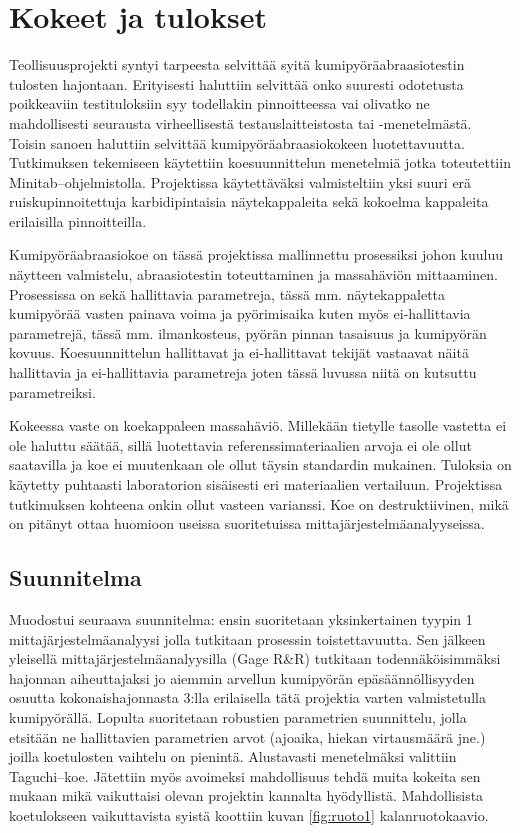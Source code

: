 \documentclass[12pt,a4paper,finnish]{tutthesis}
\begin{document}
\chapter{Kokeet ja tulokset}
\label{ch:kokeet}


Teollisuusprojekti syntyi tarpeesta selvittää syitä
kumipyöräabraasiotestin tulosten hajontaan. Erityisesti
haluttiin selvittää onko suuresti odotetusta poikkeaviin
testituloksiin syy todellakin pinnoitteessa vai olivatko
ne mahdollisesti seurausta virheellisestä testauslaitteistosta
tai -menetelmästä. Toisin sanoen haluttiin selvittää
kumipyöräabraasiokokeen luotettavuutta. Tutkimuksen tekemiseen
käytettiin koesuunnittelun menetelmiä jotka
toteutettiin Minitab–ohjelmistolla. Projektissa käytettäväksi
valmisteltiin yksi suuri erä ruiskupinnoitettuja karbidipintaisia näytekappaleita
sekä kokoelma kappaleita erilaisilla pinnoitteilla.

Kumipyöräabraasiokoe on tässä projektissa mallinnettu prosessiksi johon kuuluu
näytteen valmistelu, abraasiotestin toteuttaminen ja massahäviön
mittaaminen. Prosessissa on sekä hallittavia parametreja, tässä mm.
näytekappaletta kumipyörää vasten painava
voima ja pyörimisaika kuten myös ei-hallittavia parametrejä, tässä mm.
ilmankosteus, pyörän pinnan tasaisuus ja kumipyörän kovuus.
Koesuunnittelun hallittavat ja ei-hallittavat
tekijät vastaavat näitä hallittavia ja ei-hallittavia parametreja joten
tässä luvussa niitä on kutsuttu parametreiksi.

Kokeessa vaste on koekappaleen massahäviö. Millekään tietylle tasolle
vastetta ei ole haluttu säätää, sillä luotettavia referenssimateriaalien
arvoja ei ole ollut saatavilla ja koe ei muutenkaan ole ollut täysin
standardin mukainen. Tuloksia on käytetty puhtaasti laboratorion
sisäisesti eri materiaalien vertailuun. Projektissa tutkimuksen
kohteena onkin ollut vasteen varianssi. Koe on destruktiivinen,
mikä on pitänyt ottaa huomioon useissa suoritetuissa
mittajärjestelmäanalyyseissa.



\section{Suunnitelma}

Muodostui seuraava suunnitelma: ensin suoritetaan yksinkertainen
tyypin 1 mittajärjestelmäanalyysi jolla tutkitaan
prosessin toistettavuutta. Sen
jälkeen yleisellä mittajärjestelmäanalyysilla (Gage R\&R) tutkitaan
todennäköisimmäksi hajonnan aiheuttajaksi jo aiemmin arvellun kumipyörän
epäsäännöllisyyden osuutta kokonaishajonnasta 3:lla erilaisella tätä
projektia varten valmistetulla kumipyörällä. Lopulta suoritetaan
robustien parametrien suunnittelu, jolla etsitään ne
hallittavien parametrien arvot (ajoaika, hiekan virtausmäärä jne.)
joilla koetulosten vaihtelu on pienintä. Alustavasti menetelmäksi valittiin
Taguchi–koe. Jätettiin myös avoimeksi mahdollisuus tehdä muita
kokeita sen mukaan mikä vaikuttaisi olevan projektin kannalta
hyödyllistä. Mahdollisista koetulokseen vaikuttavista syistä koottiin
kuvan \ref{fig:ruoto1} kalanruotokaavio.
\end{document}
